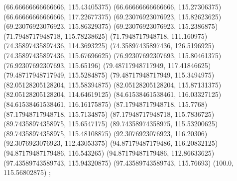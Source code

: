 {{{		(66.66666666666666, 115.43405375)
		(66.66666666666666, 115.27306375)
		(66.66666666666666, 117.22677375)
		(69.23076923076923, 115.82623625)
		(69.23076923076923, 115.86329375)
		(69.23076923076923, 115.2386875)
		(71.7948717948718, 115.78238625)
		(71.7948717948718, 111.160975)
		(74.35897435897436, 114.3693225)
		(74.35897435897436, 126.5196925)
		(74.35897435897436, 115.67696625)
		(76.92307692307693, 115.80461375)
		(76.92307692307693, 115.65196)
		(79.48717948717949, 117.41846625)
		(79.48717948717949, 115.5284875)
		(79.48717948717949, 115.3494975)
		(82.05128205128204, 115.58394875)
		(82.05128205128204, 115.87131375)
		(82.05128205128204, 114.64619125)
		(84.61538461538461, 116.03327125)
		(84.61538461538461, 116.16175875)
		(87.17948717948718, 115.7768)
		(87.17948717948718, 115.7134875)
		(87.17948717948718, 115.7836725)
		(89.74358974358975, 115.6547175)
		(89.74358974358975, 115.53200625)
		(89.74358974358975, 115.48108875)
		(92.3076923076923, 116.20306)
		(92.3076923076923, 112.43053375)
		(94.87179487179486, 116.20832125)
		(94.87179487179486, 116.543265)
		(94.87179487179486, 112.86633625)
		(97.43589743589743, 115.94320875)
		(97.43589743589743, 115.76693)
		(100.0, 115.56802875)
	};

}}
